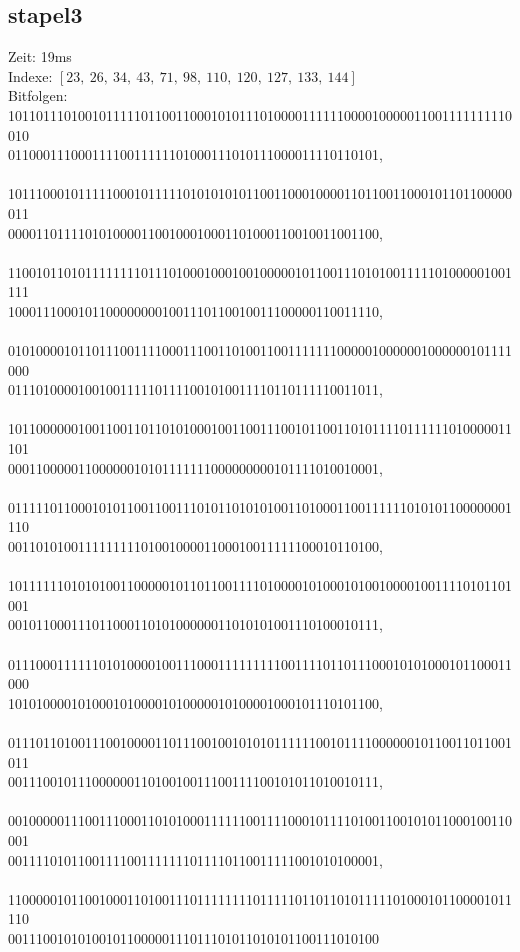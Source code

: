 \documentclass[a4paper,10pt,ngerman]{scrartcl}
\begin{document}
{\subsection{stapel3}
Zeit: 19ms \\
Indexe: $[23, \ 26, \ 34, \ 43, \ 71, \ 98, \ 110, \ 120, \ 127, \ 133, \ 144]$ \\
Bitfolgen: \\
101101110100101111101100110001010111010000111111000010000011001111111110010 \\
01100011100011110011111101000111010111000011110110101, \\\\
101110001011111000101111101010101011001100010000110110011000101101100000011 \\
00001101111010100001100100010001101000110010011001100, \\\\
110010110101111111101110100010001001000001011001110101001111101000001001111 \\
10001110001011000000001001110110010011100000110011110, \\\\
010100001011011100111100011100110100110011111110000010000001000000101111000 \\
01110100001001001111101111001010011110110111110011011, \\\\
101100000010011001101101010001001100111001011001101011110111111010000011101 \\
00011000001100000010101111111000000000101111010010001, \\\\
011111011000101011001100111010110101010011010001100111111010101100000001110 \\
00110101001111111110100100001100010011111100010110100, \\\\
101111110101010011000001011011001111010000101000101001000010011110101101001 \\
00101100011101100011010100000011010101001110100010111, \\\\
011100011111101010000100111000111111111001111011011100010101000101100011000 \\
10101000010100010100001010000010100001000101110101100, \\\\
011101101001110010000110111001001010101111110010111100000010110011011001011 \\
00111001011100000011010010011100111100101011010010111, \\\\
001000001110011100011010100011111100111100010111101001100101011000100110001 \\
00111101011001111001111111011110110011111001010100001, \\\\
110000010110010001101001110111111110111110110110101111101000101100001011110 \\
00111001010100101100000111011101011010101100111010100

}
\end{document}
